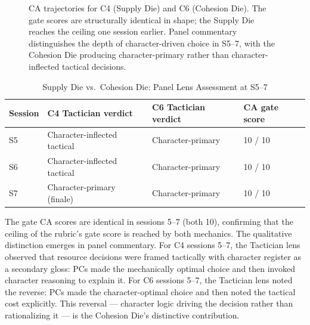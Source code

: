 \begin{figure}[t]
  \centering
  \caption{CA trajectories for C4 (Supply Die) and C6 (Cohesion Die). The gate scores
    are structurally identical in shape; the Supply Die reaches the ceiling one session
    earlier. Panel commentary distinguishes the depth of character-driven choice in S5--7,
    with the Cohesion Die producing character-primary rather than character-inflected
    tactical decisions.}
  \label{fig:cohesion-advantage}
\end{figure}

\begin{table}[t]
\caption{Supply Die vs.\ Cohesion Die: Panel Lens Assessment at S5--7}
\label{tab:differential}
\begin{tabular}{@{}llll@{}}
\toprule
Session & C4 Tactician verdict & C6 Tactician verdict & CA gate score \\
\midrule
S5 & Character-inflected tactical & Character-primary & 10 / 10 \\
S6 & Character-inflected tactical & Character-primary & 10 / 10 \\
S7 & Character-primary (finale) & Character-primary & 10 / 10 \\
\bottomrule
\end{tabular}
\end{table}

The gate CA scores are identical in sessions 5--7 (both 10), confirming that the
ceiling of the rubric's gate score is reached by both mechanics. The qualitative
distinction emerges in panel commentary. For C4 sessions 5--7, the Tactician lens
observed that resource decisions were framed tactically with character register as
a secondary gloss: PCs made the mechanically optimal choice and then invoked character
reasoning to explain it. For C6 sessions 5--7, the Tactician lens noted the reverse:
PCs made the character-optimal choice and then noted the tactical cost explicitly.
This reversal --- character logic driving the decision rather than rationalizing it ---
is the Cohesion Die's distinctive contribution.

